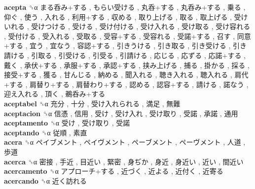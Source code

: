 \textbf{acepta} ␝α   まる呑み+する ,  もらい受ける ,  丸呑+する ,  丸呑み+する ,  乗る ,  仰ぐ ,  使う ,  入れる ,  利用+する ,  収める ,  取り上げる ,  取る ,  取上げる ,  受けいれる ,  受けつける ,  受ける ,  受け付ける ,  受け入れる ,  受け取る ,  受け容れる ,  受付ける ,  受入れる ,  受取る ,  受容+する ,  受容れる ,  受諾+する ,  召す ,  同意+する ,  宜う ,  宜なう ,  容認+する ,  引きうける ,  引き取る ,  引き受ける ,  引き請ける ,  引取る ,  引受ける ,  引受る ,  引請ける ,  応じる ,  応ずる ,  応諾+する ,  戴く ,  承伏+する ,  承服+する ,  承認+する ,  挟み上げる ,  捕る ,  掛かる ,  採る ,  接受+する ,  獲る ,  甘んじる ,  納める ,  聞入れる ,  聴き入れる ,  聴入れる ,  肩代+する ,  肩替り+する ,  肩替わり+する ,  認める ,  認容+する ,  請ける ,  諾なう ,  迎え入れる ,  頂く ,  鵜呑み+する   \\
\textbf{aceptabel} ␝α   充分 ,  十分 ,  受け入れられる ,  満足 ,  無難   \\
\textbf{aceptacion} ␝α   信憑 ,  信用 ,  受け ,  受け入れ ,  受け取り ,  受諾 ,  承諾 ,  通用   \\
\textbf{aceptamento} ␝α   受け ,  受け取り ,  受諾   \\
\textbf{aceptando} ␝α   従順 ,  素直   \\
\textbf{acera} ␝α   ペイブメント ,  ペイヴメント ,  ペーブメント ,  ペーヴメント ,  人道 ,  歩道   \\
\textbf{acerca} ␝α   密接 ,  手近 ,  目近い ,  緊密 ,  身ぢか ,  身近 ,  身近い ,  近い ,  間近い   \\
\textbf{acercamento} ␝α   アプローチ+する ,  近づく ,  近よる ,  近付く ,  近寄る   \\
\textbf{acercando} ␝α   近く訪れる   \\
